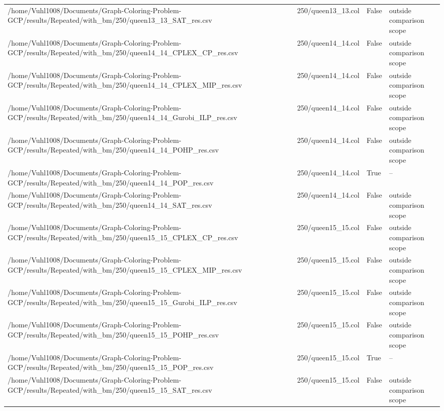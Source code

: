 \begin{table}[htbp]
\begin{tabular}{llll}
/home/Vuhl1008/Documents/Graph-Coloring-Problem-GCP/results/Repeated/with\_bm/250/queen13\_13\_SAT\_res.csv & 250/queen13\_13.col & False & outside comparison scope \\
/home/Vuhl1008/Documents/Graph-Coloring-Problem-GCP/results/Repeated/with\_bm/250/queen14\_14\_CPLEX\_CP\_res.csv & 250/queen14\_14.col & False & outside comparison scope \\
/home/Vuhl1008/Documents/Graph-Coloring-Problem-GCP/results/Repeated/with\_bm/250/queen14\_14\_CPLEX\_MIP\_res.csv & 250/queen14\_14.col & False & outside comparison scope \\
/home/Vuhl1008/Documents/Graph-Coloring-Problem-GCP/results/Repeated/with\_bm/250/queen14\_14\_Gurobi\_ILP\_res.csv & 250/queen14\_14.col & False & outside comparison scope \\
/home/Vuhl1008/Documents/Graph-Coloring-Problem-GCP/results/Repeated/with\_bm/250/queen14\_14\_POHP\_res.csv & 250/queen14\_14.col & False & outside comparison scope \\
/home/Vuhl1008/Documents/Graph-Coloring-Problem-GCP/results/Repeated/with\_bm/250/queen14\_14\_POP\_res.csv & 250/queen14\_14.col & True & -- \\
/home/Vuhl1008/Documents/Graph-Coloring-Problem-GCP/results/Repeated/with\_bm/250/queen14\_14\_SAT\_res.csv & 250/queen14\_14.col & False & outside comparison scope \\
/home/Vuhl1008/Documents/Graph-Coloring-Problem-GCP/results/Repeated/with\_bm/250/queen15\_15\_CPLEX\_CP\_res.csv & 250/queen15\_15.col & False & outside comparison scope \\
/home/Vuhl1008/Documents/Graph-Coloring-Problem-GCP/results/Repeated/with\_bm/250/queen15\_15\_CPLEX\_MIP\_res.csv & 250/queen15\_15.col & False & outside comparison scope \\
/home/Vuhl1008/Documents/Graph-Coloring-Problem-GCP/results/Repeated/with\_bm/250/queen15\_15\_Gurobi\_ILP\_res.csv & 250/queen15\_15.col & False & outside comparison scope \\
/home/Vuhl1008/Documents/Graph-Coloring-Problem-GCP/results/Repeated/with\_bm/250/queen15\_15\_POHP\_res.csv & 250/queen15\_15.col & False & outside comparison scope \\
/home/Vuhl1008/Documents/Graph-Coloring-Problem-GCP/results/Repeated/with\_bm/250/queen15\_15\_POP\_res.csv & 250/queen15\_15.col & True & -- \\
/home/Vuhl1008/Documents/Graph-Coloring-Problem-GCP/results/Repeated/with\_bm/250/queen15\_15\_SAT\_res.csv & 250/queen15\_15.col & False & outside comparison scope \\

\end{tabular}
\end{table}
